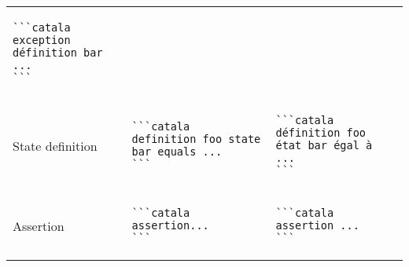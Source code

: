 \documentclass[a3paper,landscape]{article}
\begin{document}
\begin{multicols*}{2}
\begin{center}
\begin{tabular}{p{}p{}p{}}
\begin{verbatim}
```catala
exception définition bar ...
```
\end{verbatim}
      \vspace*{-1.75em}
      \\
      State definition                        &
      \vspace*{-1.75em}
      \begin{verbatim}
```catala
definition foo state bar equals ...
```
\end{verbatim}
      \vspace*{-1.75em}
                                              &
      \vspace*{-1.75em}
      \begin{verbatim}
```catala
définition foo état bar égal à ...
```
\end{verbatim}
      \vspace*{-1.75em}
      \\
      Assertion                               &
      \vspace*{-1.75em}
      \begin{verbatim}
```catala
assertion...
```
\end{verbatim}
      \vspace*{-1.75em}
                                              &
      \vspace*{-1.75em}
      \begin{verbatim}
```catala
assertion ...
```
\end{verbatim}
      \vspace*{-1.75em}
      \\
      \bottomrule
    \end{tabular}
  \end{center}






\end{multicols*}
\end{document}

